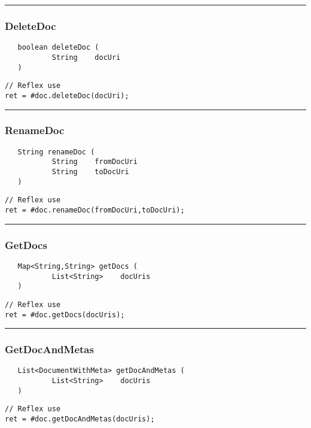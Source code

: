 \rule{15cm}{2pt}
\subsubsection{DeleteDoc}
\label{Api:DeleteDoc}
\begin{verbatim}
   boolean deleteDoc (
           String    docUri
   )
\end{verbatim}
\begin{lstlisting}[language=reflex]
// Reflex use
ret = #doc.deleteDoc(docUri);
\end{lstlisting}



\rule{15cm}{2pt}
\subsubsection{RenameDoc}
\label{Api:RenameDoc}
\begin{verbatim}
   String renameDoc (
           String    fromDocUri
           String    toDocUri
   )
\end{verbatim}
\begin{lstlisting}[language=reflex]
// Reflex use
ret = #doc.renameDoc(fromDocUri,toDocUri);
\end{lstlisting}



\rule{15cm}{2pt}
\subsubsection{GetDocs}
\label{Api:GetDocs}
\begin{verbatim}
   Map<String,String> getDocs (
           List<String>    docUris
   )
\end{verbatim}
\begin{lstlisting}[language=reflex]
// Reflex use
ret = #doc.getDocs(docUris);
\end{lstlisting}



\rule{15cm}{2pt}
\subsubsection{GetDocAndMetas}
\label{Api:GetDocAndMetas}
\begin{verbatim}
   List<DocumentWithMeta> getDocAndMetas (
           List<String>    docUris
   )
\end{verbatim}
\begin{lstlisting}[language=reflex]
// Reflex use
ret = #doc.getDocAndMetas(docUris);
\end{lstlisting}



